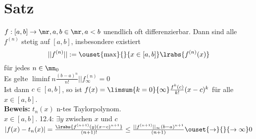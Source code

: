 \section{Satz}
	$ f:[a,b]\rightarrow\mr,a,b\in\mr,a<b $ unendlich oft differenzierbar. Dann sind alle $ f^{(n)} $ stetig auf $ [a,b] $, insbesondere existiert
	\[||f^{(n)}||:=\ouset{\max}{}{x\in[a,b]}\lrabs{f^{(n)}(x)}\]
	für jedes $ n\in\mn_0 $\\
	Es gelte $ \liminf{n}\frac{(b-a)^n}{n!}||f^{(n)}_\infty=0 $\\
	Ist dann $ c\in[a,b] $, so ist $ f(x)=\limsum{k=0}{\infty}\frac{f^{k}(c)}{k!}(x-c)^k $ für alle $ x\in[a,b] $.\\
	\textbf{Beweis:} $ t_n(x) $ n-tes Taylorpolynom.\\
	$ x\in[a,b] $. 12.4: $ \exists y $ zwischen $ x $ und $ c $\\
	$ |f(x)-t_n(x)|=\frac{\lrabs{f^{(n+1)}(y)(x-c)^{n+1}}}{(n+1)!}\leq\frac{||f^{(n+1)}||_\infty(b-a)^{n+1}}{(n+1)}\ouset{\rightarrow}{}{\rightarrow\infty}0 $
	
